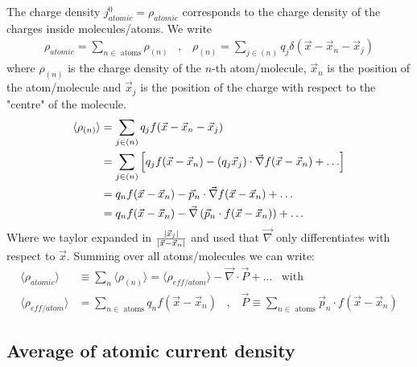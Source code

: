 The charge density $j_{atomic}^0 = \rho_{atomic}$ corresponds to the charge
density of the charges inside molecules/atoms. We write
\begin{align*}
    \rho_{atomic} = \sum_{n \in \text{ atoms}} \rho_{(n)}
    \hspace{10pt} , \hspace{10pt}
    \rho_{(n)} = \sum_{j \in (n)} q_j \delta(\vec{x} - \vec{x}_n - \vec{x}_j)
\end{align*}
where $\rho_{(n)}$ is the charge density of the $n$-th atom/molecule,
$\vec{x}_n$ is the position of the atom/molecule and $\vec{x}_j$ is the
position of the charge with respect to the "centre" of the molecule.
\begin{align*}
    \langle \rho_{(n)} \rangle &= \sum_{j \in (n)} q_j f(\vec{x} - \vec{x}_n - \vec{x}_j)
    \\
    &= \sum_{j \in (n)} \eckigeklammer{q_j f(\vec{x} - \vec{x}_n) - (q_j \vec{x}_j) \cdot \vec{\nabla}f(\vec{x}-\vec{x}_n) + \dots}
    \\
    &= q_n f(\vec{x} - \vec{x}_n) - \vec{p}_n \cdot \vec{\nabla} f(\vec{x}-\vec{x}_n) + \dots
    \\
    &= q_n f(\vec{x}-\vec{x}_n) - \vec{\nabla} \klammer{\vec{p}_n \cdot f(\vec{x} - \vec{x}_n)} + \dots
\end{align*}
Where we taylor expanded in $\frac{\left\vert \vec{x}_j \right\vert}{\left\vert \vec{x}-\vec{x}_n \right\vert}$ and
used that $\vec{\nabla}$ only differentiates with respect to $\vec{x}$. Summing
over all atoms/molecules we can write:
\begin{align*}
    \langle \rho_{atomic} \rangle &\equiv \sum_n \langle \rho_{(n)} \rangle
    = \langle \rho_{eff/atom} \rangle - \vec{\nabla} \cdot \vec{P} + \dots
    \hspace{10pt} \text{with}
    \\
    \langle \rho_{eff/atom} \rangle
    &= \sum_{n \in \text{ atoms}} q_n f(\vec{x} - \vec{x}_n)
    \hspace{10pt} , \hspace{10pt}
    \vec{P} \equiv \sum_{n \in \text{ atoms}} \vec{p}_n \cdot f(\vec{x}-\vec{x}_n)
\end{align*}

\subsection{Average of atomic current density}

